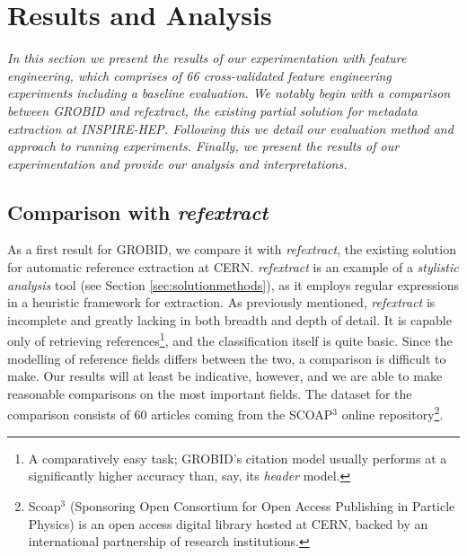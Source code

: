 
\chapter{Results and Analysis} %

\label{Chapter5} %


\emph{In this section we present the results of our experimentation with feature engineering, which comprises of 66 cross-validated feature engineering experiments including a baseline evaluation. We notably begin with a comparison between GROBID and refextract, the existing partial solution for metadata extraction at INSPIRE-HEP. Following this we detail our evaluation method and approach to running experiments. Finally, we present the results of our experimentation and provide our analysis and interpretations.}

\section{Comparison with \emph{refextract}}

As a first result for GROBID, we compare it with \emph{refextract}, the existing solution for automatic reference extraction at CERN. \emph{refextract} is an example of a \emph{stylistic analysis} tool (see Section \ref{sec:solutionmethods}), as it employs regular expressions in a heuristic framework for extraction. As previously mentioned, \emph{refextract} is incomplete and greatly lacking in both breadth and depth of detail. It is capable only of retrieving references\footnote{A comparatively easy task; GROBID's citation model usually performs at a significantly higher accuracy than, say, its \emph{header} model.}, and the classification itself is quite basic. Since the modelling of reference fields differs between the two, a comparison is difficult to make. Our results will at least be indicative, however, and we are able to make reasonable comparisons on the most important fields. The dataset for the comparison consists of 60 articles coming from the SCOAP$^3$ online repository\footnote{Scoap$^3$ (Sponsoring Open Consortium for Open Access Publishing in Particle Physics) is an open access digital library hosted at CERN, backed by an international partnership of research institutions.}.

